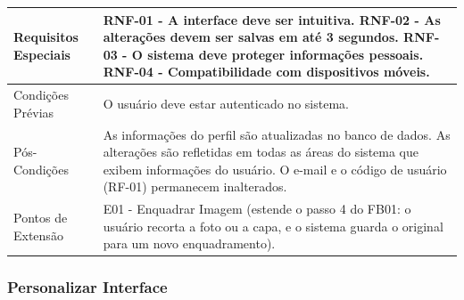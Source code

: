 \begin{longtable}{ >{\raggedright}p{2.8cm} | >{\raggedright\arraybackslash}p{10.7cm} }
Requisitos Especiais & RNF-01 - A interface deve ser intuitiva. RNF-02 - As alterações devem ser salvas em até 3 segundos. RNF-03 - O sistema deve proteger informações pessoais. RNF-04 - Compatibilidade com dispositivos móveis. \\ \hline

Condições Prévias & O usuário deve estar autenticado no sistema. \\ \hline

Pós-Condições & As informações do perfil são atualizadas no banco de dados. As alterações são refletidas em todas as áreas do sistema que exibem informações do usuário. O e-mail e o código de usuário (RF-01) permanecem inalterados. \\ \hline

Pontos de Extensão & E01 - Enquadrar Imagem (estende o passo 4 do FB01: o usuário recorta a foto ou a capa, e o sistema guarda o original para um novo enquadramento). \\
\end{longtable}
\renewcommand{\arraystretch}{1}
\FloatBarrier


\subsubsection{Personalizar Interface}

